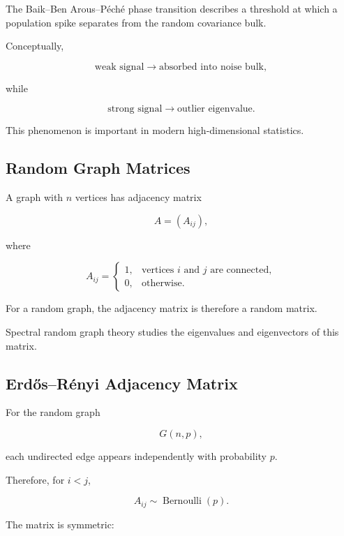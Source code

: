 The Baik--Ben Arous--Péché phase transition describes a threshold at
which a population spike separates from the random covariance bulk.

Conceptually,

\[
\boxed{
\text{weak signal}
\longrightarrow
\text{absorbed into noise bulk},
}
\]

while

\[
\boxed{
\text{strong signal}
\longrightarrow
\text{outlier eigenvalue}.
}
\]

This phenomenon is important in modern high-dimensional statistics.

\subsection{Random Graph Matrices}
\label{subsec:random-graph-matrices}

A graph with \(n\) vertices has adjacency matrix

\[
A=(A_{ij}),
\]

where

\[
A_{ij}
=
\begin{cases}
1,&\text{vertices \(i\) and \(j\) are connected},\\
0,&\text{otherwise}.
\end{cases}
\]

For a random graph, the adjacency matrix is therefore a random matrix.

Spectral random graph theory studies the eigenvalues and eigenvectors of
this matrix.

\subsection{Erd\H{o}s--R\'enyi Adjacency Matrix}
\label{subsec:erdos-renyi-adjacency}

For the random graph

\[
G(n,p),
\]

each undirected edge appears independently with probability \(p\).

Therefore, for \(i<j\),

\[
\boxed{
A_{ij}
\sim
\operatorname{Bernoulli}(p).
}
\]

The matrix is symmetric:

